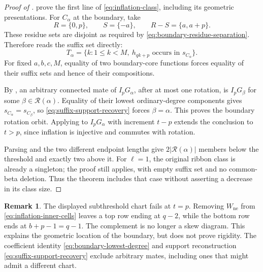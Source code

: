 \documentclass[11pt,a4paper]{amsart}
\numberwithin{equation}{section}
\theoremstyle{plain}
\theoremstyle{definition}
\newtheorem{remark}[theorem]{Remark}
\begin{document}
\begin{proof}[Proof of ]
 prove the
first line of \eqref{eq:inflation-class}, including its geometric
presentations.  For \(C_\alpha\) at the boundary, take
\[
 R=\{0,p\},\qquad S=\{-a\},\qquad R-S=\{a,a+p\}.
\]
These residue sets are disjoint as required by
\eqref{eq:boundary-residue-separation}.  Therefore
 reads the suffix set directly:
\begin{equation}\label{eq:suffix-support-recovery}
 T_\alpha=
 \{k:1\le k<M,\ h_{qk+p}\text{ occurs in }s_{C_\alpha}\}.
\end{equation}
For fixed \(a,b,c,M\), equality of two boundary-core functions forces
equality of their suffix sets and hence of their compositions.

By , an arbitrary connected mate of
\(I_pG_\alpha\), after at most one rotation, is \(I_pG_\beta\)
for some \(\beta\in\mathcal R(\alpha)\).
Equality of their lowest ordinary-degree components gives
\(s_{C_\alpha}=s_{C_\beta}\), so
\eqref{eq:suffix-support-recovery} forces \(\beta=\alpha\).
This proves the boundary rotation orbit.  Applying
 to \(I_pG_\alpha\) with increment
\(t-p\) extends the conclusion to \(t>p\), since inflation is
injective and commutes with rotation.

Parsing and the two different endpoint lengths give
\(2|\mathcal R(\alpha)|\) members below the threshold and exactly
two above it.  For \(\ell=1\), the original ribbon class is already
a singleton; the proof still applies, with empty suffix set and no
common-beta deletion.  Thus the theorem includes that case without
asserting a decrease in its class size.
\end{proof}

\begin{remark}\label{rem:chart-boundary}
The displayed subthreshold chart fails at \(t=p\).  Removing
\(W_{\mathrm{ne}}\) from \eqref{eq:inflation-inner-cells} leaves a
top row ending at \(q-2\), while the bottom row ends at
\(b+p-1=q-1\).  The complement is no longer a skew diagram.
This explains the geometric location of the boundary, but does not
prove rigidity.  The coefficient identity
\eqref{eq:boundary-lowest-degree} and support reconstruction
\eqref{eq:suffix-support-recovery} exclude arbitrary mates, including
ones that might admit a different chart.
\end{remark}
\end{document}
